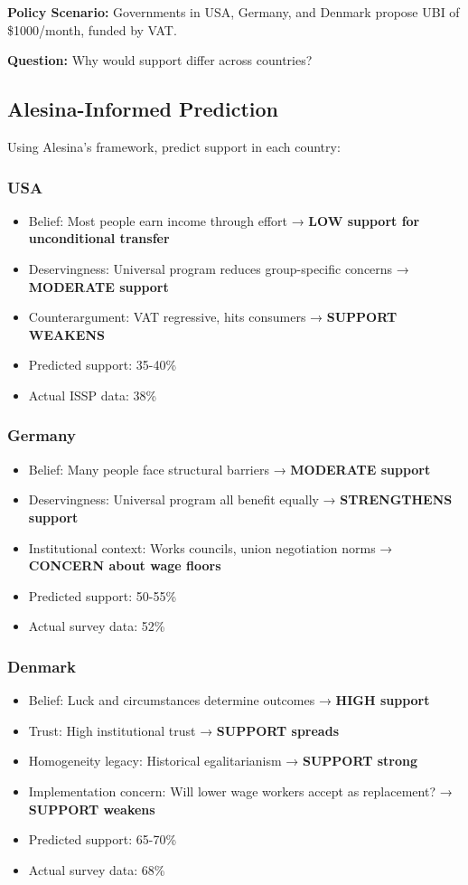 \textbf{Policy Scenario:} Governments in USA, Germany, and Denmark propose UBI of \$1000/month, funded by VAT.

\textbf{Question:} Why would support differ across countries?

\subsection{Alesina-Informed Prediction}

Using Alesina's framework, predict support in each country:

\subsubsection{USA}
\begin{itemize}
\item Belief: Most people earn income through effort → \textbf{LOW support for unconditional transfer}
\item Deservingness: Universal program reduces group-specific concerns → \textbf{MODERATE support}
\item Counterargument: VAT regressive, hits consumers → \textbf{SUPPORT WEAKENS}
\item Predicted support: 35-40\%
\item Actual ISSP data: 38\%
\end{itemize}

\subsubsection{Germany}
\begin{itemize}
\item Belief: Many people face structural barriers → \textbf{MODERATE support}
\item Deservingness: Universal program all benefit equally → \textbf{STRENGTHENS support}
\item Institutional context: Works councils, union negotiation norms → \textbf{CONCERN about wage floors}
\item Predicted support: 50-55\%
\item Actual survey data: 52\%
\end{itemize}

\subsubsection{Denmark}
\begin{itemize}
\item Belief: Luck and circumstances determine outcomes → \textbf{HIGH support}
\item Trust: High institutional trust → \textbf{SUPPORT spreads}
\item Homogeneity legacy: Historical egalitarianism → \textbf{SUPPORT strong}
\item Implementation concern: Will lower wage workers accept as replacement? → \textbf{SUPPORT weakens}
\item Predicted support: 65-70\%
\item Actual survey data: 68\%
\end{itemize}

